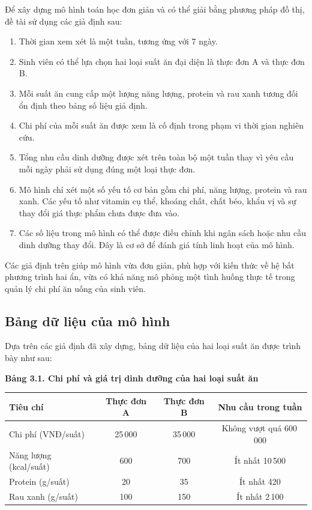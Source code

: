 \documentclass[12pt,a4paper]{article}
\begin{document}
Để xây dựng mô hình toán học đơn giản và có thể giải bằng phương pháp đồ thị, đề tài sử dụng các giả định sau:
\begin{enumerate}
    \item Thời gian xem xét là một tuần, tương ứng với 7 ngày.
    \item Sinh viên có thể lựa chọn hai loại suất ăn đại diện là thực đơn A và thực đơn B.
    \item Mỗi suất ăn cung cấp một lượng năng lượng, protein và rau xanh tương đối ổn định theo bảng số liệu giả định.
    \item Chi phí của mỗi suất ăn được xem là cố định trong phạm vi thời gian nghiên cứu.
    \item Tổng nhu cầu dinh dưỡng được xét trên toàn bộ một tuần thay vì yêu cầu mỗi ngày phải sử dụng đúng một loại thực đơn.
    \item Mô hình chỉ xét một số yếu tố cơ bản gồm chi phí, năng lượng, protein và rau xanh. Các yếu tố như vitamin cụ thể, khoáng chất, chất béo, khẩu vị và sự thay đổi giá thực phẩm chưa được đưa vào.
    \item Các số liệu trong mô hình có thể được điều chỉnh khi ngân sách hoặc nhu cầu dinh dưỡng thay đổi. Đây là cơ sở để đánh giá  tính linh hoạt của mô hình.
\end{enumerate}

Các giả định trên giúp mô hình vừa đơn giản, phù hợp với kiến thức về hệ bất phương trình hai ẩn, vừa có khả năng mô phỏng một tình huống thực tế trong quản lý chi phí ăn uống của sinh viên.

\subsection{Bảng dữ liệu của mô hình}

Dựa trên các giả định đã xây dựng, bảng dữ liệu của hai loại suất ăn được trình bày như sau:

\begin{center}
\textbf{Bảng 3.1. Chi phí và giá trị dinh dưỡng của hai loại suất ăn}
\end{center}

\begin{center}
\renewcommand{\arraystretch}{1.4}

\begin{tabular}{|p{4.0cm}|c|c|c|}
\hline
\textbf{Tiêu chí}
&
\textbf{Thực đơn A}
&
\textbf{Thực đơn B}
&
\textbf{Nhu cầu trong tuần}
\\
\hline

Chi phí (VNĐ/suất)
&
25\,000
&
35\,000
&
Không vượt quá 600\,000
\\
\hline

Năng lượng (kcal/suất)
&
600
&
700
&
Ít nhất 10\,500
\\
\hline

Protein (g/suất)
&
20
&
35
&
Ít nhất 420
\\
\hline

Rau xanh (g/suất)
&
100
&
150
&
Ít nhất 2\,100
\\
\hline

\end{tabular}
\end{center}
\end{document}
